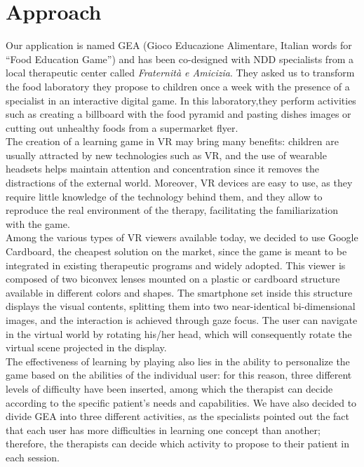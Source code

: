 \documentclass{sigchi-ext}
\begin{document}
    
\section{Approach}
Our application is named GEA (Gioco Educazione Alimentare, Italian words for “Food Education Game”) and has been co-designed with NDD specialists from a local therapeutic center called \emph{Fraternità e Amicizia}. They asked us to transform the food laboratory they propose to children once a week with the presence of a specialist in an interactive digital game. In this laboratory,they perform activities such as creating a billboard with the food pyramid and pasting dishes images or cutting out unhealthy foods from a supermarket flyer. \\
\medskip
The creation of a learning game in VR may bring many benefits: children are usually attracted by new technologies such as VR, and the use of wearable headsets helps maintain attention and concentration since it removes the distractions of the external world. Moreover, VR devices are easy to use, as they require little knowledge of the technology behind them, and they allow to reproduce the real environment of the therapy, facilitating the familiarization with the game.\\ 
\medskip
Among the various types of VR viewers available today, we decided to use Google Cardboard, the cheapest solution on the market, since the game is meant to be integrated in existing therapeutic programs and widely adopted. This viewer is composed of two biconvex lenses mounted on a plastic or cardboard structure available in different colors and shapes. The smartphone set inside this structure displays the visual contents, splitting them into two near-identical bi-dimensional images, and the interaction is achieved through gaze focus. The user can navigate in the virtual world by rotating his/her head, which will consequently rotate the virtual scene projected in the display.\\
\medskip
The effectiveness of learning by playing also lies in the ability to personalize the game based on the abilities of the individual user: for this reason, three different levels of difficulty have been inserted, among which the therapist can decide according to the specific patient’s needs and capabilities. We have also decided to divide GEA into three different activities, as the specialists pointed out the fact that each user has more difficulties in learning one concept than another; therefore, the therapists can decide which activity to propose to their patient in each session.
\end{document}
